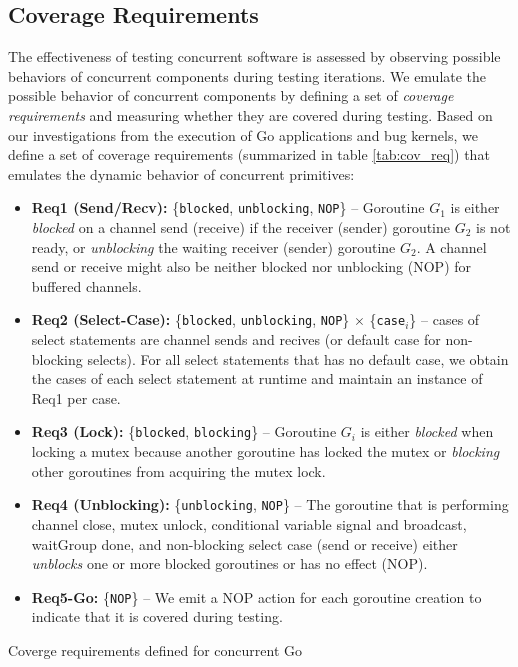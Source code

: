 \subsection{Coverage Requirements}
\label{sec:covreq}
The effectiveness of testing concurrent software is assessed by observing possible behaviors of concurrent components during testing iterations.
%
We emulate the possible behavior of concurrent components by defining a set of \textit{coverage requirements} and measuring whether they are covered during testing.
%
Based on our investigations from the execution of Go applications and bug kernels, we define a set of coverage requirements (summarized in table \ref{tab:cov_req}) that emulates the dynamic behavior of concurrent primitives:
%
\begin{itemize}
  \item \textbf{Req1 (Send/Recv):} \{\texttt{blocked}, \texttt{unblocking}, \texttt{NOP}\} -- Goroutine $G_1$ is either \textit{blocked} on a channel send (receive) if the receiver (sender) goroutine $G_2$ is not ready, or \textit{unblocking} the waiting receiver (sender) goroutine $G_2$. A channel send or receive might also be neither blocked nor unblocking (NOP) for buffered channels.
  \item \textbf{Req2 (Select-Case):} \{\texttt{blocked}, \texttt{unblocking}, \texttt{NOP}\} $\times$ \{\texttt{case}$_i$\} -- cases of select statements are channel sends and recives (or default case for non-blocking selects). For all select statements that has no default case, we obtain the cases of each select statement at runtime and maintain an instance of Req1 per case.
  \item \textbf{Req3 (Lock):} \{\texttt{blocked}, \texttt{blocking}\} -- Goroutine $G_i$ is either \textit{blocked} when locking a mutex because another goroutine has locked the mutex or \textit{blocking} other goroutines from acquiring the mutex lock.
  \item \textbf{Req4 (Unblocking):} \{\texttt{unblocking}, \texttt{NOP}\} -- The goroutine that is performing channel close, mutex unlock, conditional variable signal and broadcast, waitGroup done, and non-blocking select case (send or receive) either \textit{unblocks} one or more blocked goroutines or has no effect (NOP).
  \item \textbf{Req5-Go:} \{\texttt{NOP}\} -- We emit a NOP action for each goroutine creation to indicate that it is covered during testing.
\end{itemize}


\begin{table}[]
\centering
\caption{Coverge requirements defined for concurrent Go}
\scalebox{0.83}{

}
\label{tab:cov_req}
\end{table}

